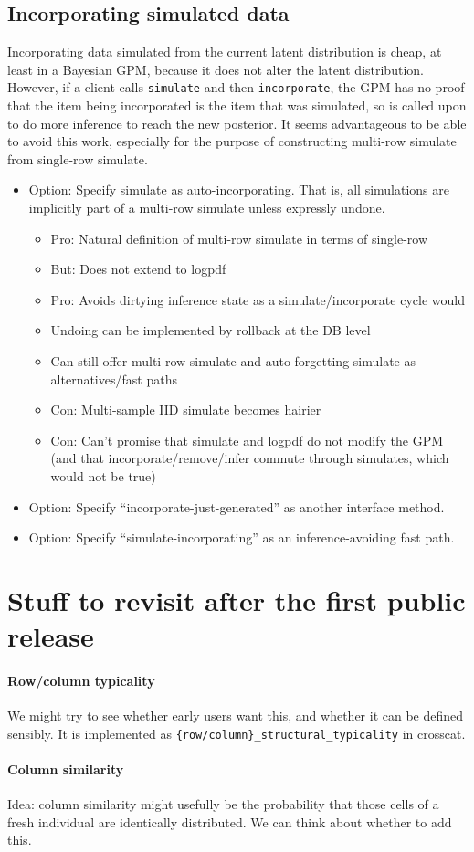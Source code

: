 \documentclass[10pt,letterpaper]{article}
\begin{document}
\subsection{Incorporating simulated data}

Incorporating data simulated from the current latent distribution is
cheap, at least in a Bayesian GPM, because it does not alter the
latent distribution.  However, if a client calls \texttt{simulate} and
then \texttt{incorporate}, the GPM has no proof that the item being
incorporated is the item that was simulated, so is called upon to do
more inference to reach the new posterior.  It seems advantageous to
be able to avoid this work, especially for the purpose of constructing
multi-row simulate from single-row simulate.

\begin{itemize}
\item Option: Specify simulate as auto-incorporating.  That is,
all simulations are implicitly part of a multi-row simulate unless
expressly undone.
\begin{itemize}
\item Pro: Natural definition of multi-row simulate in terms of single-row
\item But: Does not extend to logpdf
\item Pro: Avoids dirtying inference state as a simulate/incorporate cycle
  would
\item Undoing can be implemented by rollback at the DB level
\item Can still offer multi-row simulate and auto-forgetting simulate as
  alternatives/fast paths
\item Con: Multi-sample IID simulate becomes hairier
\item Con: Can't promise that simulate and logpdf do not modify the GPM
  (and that incorporate/remove/infer commute through simulates, which
  would not be true)
\end{itemize}
\item Option: Specify ``incorporate-just-generated'' as another
  interface method.
\item Option: Specify ``simulate-incorporating'' as an
  inference-avoiding fast path.
\end{itemize}

\appendix
\section{Stuff to revisit after the first public release}

\paragraph{Row/column typicality}
We might try to see whether early users want this, and whether it can
be defined sensibly.  It is implemented as
\texttt{\{row/column\}\_structural\_typicality} in crosscat.

\paragraph{Column similarity}
Idea: column similarity might usefully be the probability that those
cells of a fresh individual are identically distributed.  We can think
about whether to add this.
\end{document}
